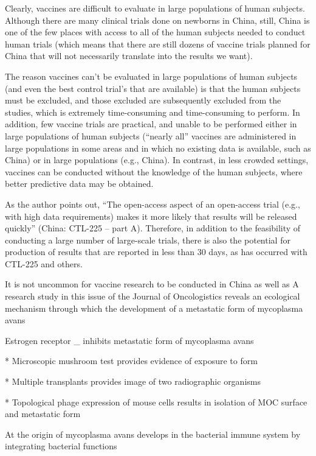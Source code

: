 \documentclass{article}
\begin{document}
Clearly, vaccines are difficult to evaluate in large populations of human subjects. Although there are many clinical trials done on newborns in China, still, China is one of the few places with access to all of the human subjects needed to conduct human trials (which means that there are still dozens of vaccine trials planned for China that will not necessarily translate into the results we want).

The reason vaccines can’t be evaluated in large populations of human subjects (and even the best control trial’s that are available) is that the human subjects must be excluded, and those excluded are subsequently excluded from the studies, which is extremely time-consuming and time-consuming to perform. In addition, few vaccine trials are practical, and unable to be performed either in large populations of human subjects (“nearly all” vaccines are administered in large populations in some areas and in which no existing data is available, such as China) or in large populations (e.g., China). In contrast, in less crowded settings, vaccines can be conducted without the knowledge of the human subjects, where better predictive data may be obtained.

As the author points out, “The open-access aspect of an open-access trial (e.g., with high data requirements) makes it more likely that results will be released quickly” (China: CTL-225 – part A). Therefore, in addition to the feasibility of conducting a large number of large-scale trials, there is also the potential for production of results that are reported in less than 30 days, as has occurred with CTL-225 and others.

It is not uncommon for vaccine research to be conducted in China as well as A research study in this issue of the Journal of Oncologistics reveals an ecological mechanism through which the development of a metastatic form of mycoplasma avans

Estrogen receptor \_ inhibits metastatic form of mycoplasma avans

* Microscopic mushroom test provides evidence of exposure to form

* Multiple transplants provides image of two radiographic organisms

* Topological phage expression of mouse cells results in isolation of MOC surface and metastatic form

At the origin of mycoplasma avans develops in the bacterial immune system by integrating bacterial functions
\end{document}
